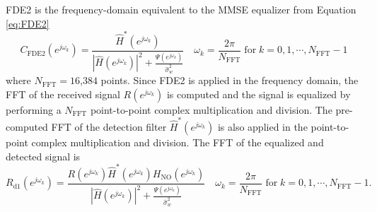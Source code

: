 FDE2 is the frequency-domain equivalent to the MMSE equalizer from Equation \eqref{eq:FDE2}
\begin{equation}
C_\text{FDE2}(e^{j\omega_k}) = \frac{\hat{H}^\ast(e^{j\omega_k})}  {|\hat{H}(e^{j\omega_k})|^2  +  \frac{\Psi(e^{j\omega_k})}{\hat{\sigma}^2_w}} \quad
\omega_k = \frac{2\pi}{N_\text{FFT}} \;
\text{for} \;
k=0,1,\cdots,N_\text{FFT}-1
\label{eq:FDE2_imp}
\end{equation}
where $N_\text{FFT} = 16$,$384$ points. Since FDE2 is applied in the frequency domain, the FFT of the received signal $R(e^{j\omega_k})$ is computed and the signal is equalized by performing a $N_\text{FFT}$ point-to-point complex multiplication and division.
The pre-computed FFT of the detection filter $\hat{H}^\ast(e^{j\omega_k})$ is also applied in the point-to-point complex multiplication and division.
The FFT of the equalized and detected signal is
\begin{equation}
R_\text{d1}(e^{j\omega_k}) = \frac{R(e^{j\omega_k}) \hat{H}^\ast(e^{j\omega_k}) H_{\text{NO}}(e^{j\omega_k})}  {|\hat{H}(e^{j\omega_k})|^2  +  \frac{\Psi(e^{j\omega_k})}{\hat{\sigma}^2_w}} \quad
\omega_k = \frac{2\pi}{N_\text{FFT}} \;
\text{for} \;
k=0,1,\cdots,N_\text{FFT}-1.
\label{eq:FDE2_applied}
\end{equation}

